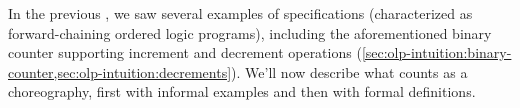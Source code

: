 \documentclass[
  class=../hdeyoung-proposal,
  crop=false
]{standalone}
\begin{document}
In the previous , we saw several examples of specifications (characterized as forward-chaining ordered logic programs), including the aforementioned binary counter supporting increment and decrement operations (\cref{sec:olp-intuition:binary-counter,sec:olp-intuition:decrements}).
We'll now describe what counts as a choreography, first with informal examples and then with formal definitions.




\end{document}
